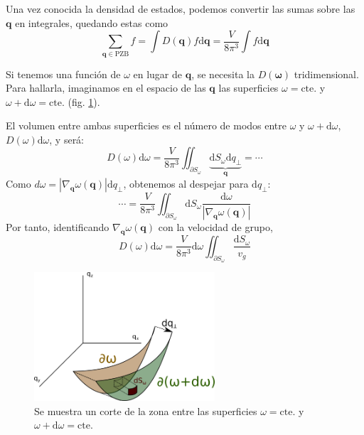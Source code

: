 Una vez conocida la densidad de estados, podemos convertir las sumas
sobre las $\mathbf{q}$ en integrales, quedando estas como
\begin{equation}
  \sum_{\mathbf{q}\in \text{PZB}} f = \int D(\mathbf{q}) f \text{d}\mathbf{q} =
  \frac{V}{8\pi^3}\int f \text{d}\mathbf{q}
\end{equation}

Si tenemos una función de $\omega$ en lugar de $\mathbf{q}$, se
necesita la $D(\boldsymbol{\omega})$ tridimensional. Para hallarla,
imaginamos en el espacio de las $\mathbf{q}$ las superficies
$\omega = \text{cte.}$ y $\omega +
\text{d}\omega = \text{cte.}$ (fig. \ref{fig:wsurface}).


El volumen entre ambas superficies es el número de modos entre
$\omega$ y $\omega + \text{d}\omega$, $D(\omega) \text{d}\omega$, y será:
\begin{equation}
  D(\omega) \text{d} \omega = \frac{V}{8\pi^3} \iint_{\partial
    S_\omega} \underbrace{\text{d}S_\omega \text{d}q_\perp}_{\mathbf{q}} = \cdots
\end{equation}
Como $d\omega = |\nabla_\mathbf{q}
\omega(\mathbf{q})|\text{d}q_\perp$, obtenemos al despejar para
$\text{d}q_\perp$:
\begin{equation}
 \cdots = \frac{V}{8\pi^3} \iint_{\partial S_\omega} \text{d}S_\omega \frac{\text{d}\omega}{|\nabla_\mathbf{q}\omega(\mathbf{q})|}
\end{equation}
Por tanto, identificando $\nabla_\mathbf{q} \omega(\mathbf{q})$ con la
velocidad de grupo,
\begin{equation}
  D(\omega) \text{d}\omega = \frac{V}{8\pi^3}  \text{d}\omega \iint_{\partial
    S_\omega} \frac{\text{d}S_\omega}{v_g}
\end{equation}

\begin{figure}
  \centering
  \includegraphics[width=0.6\textwidth]{figures/wsurface.png}
  \caption{Se muestra un corte de la zona entre las superficies
    $\omega = \text{cte.}$ y $\omega + \text{d}\omega= \text{cte.}$}
  \label{fig:wsurface}
\end{figure}

